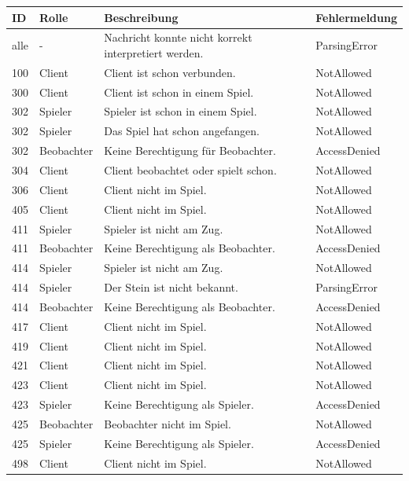 \documentclass[a4paper, 10pt]{article}
\begin{document}
\begin{center}
	\begin{tabular}{| l | l | l | l |}
		\hline
			ID & Rolle & Beschreibung & Fehlermeldung\\
		\hline \hline
			alle & - & Nachricht konnte nicht korrekt interpretiert werden. & ParsingError\\
		\hline
			100 & Client &
			Client ist schon verbunden. & NotAllowed\\
		\hline
			300 & Client &
			Client ist schon in einem Spiel. & NotAllowed\\
		\hline
			302 & Spieler &
			Spieler ist schon in einem Spiel. & NotAllowed\\
		\hline
			302 & Spieler & Das Spiel hat schon angefangen. & NotAllowed\\
		\hline
			302 & Beobachter &
			Keine Berechtigung für Beobachter. & AccessDenied\\
		\hline
			304 & Client &
			Client beobachtet oder spielt schon. & NotAllowed\\
		\hline
			306 & Client &
			Client nicht im Spiel. & NotAllowed\\
		\hline
			405 & Client &
			Client nicht im Spiel. & NotAllowed\\
		\hline
			411 & Spieler & Spieler ist nicht am Zug. & NotAllowed\\
		\hline
			411 & Beobachter & Keine Berechtigung als Beobachter. & AccessDenied\\
		\hline
			414 & Spieler & Spieler ist nicht am Zug. & NotAllowed\\
		\hline
			414 & Spieler & Der Stein ist nicht bekannt. & ParsingError\\
		\hline
			414 & Beobachter & Keine Berechtigung als Beobachter. & AccessDenied\\
		\hline
			417 & Client & Client nicht im Spiel. & NotAllowed\\
		\hline
			419 & Client & Client nicht im Spiel. & NotAllowed\\
		\hline
			421 & Client & Client nicht im Spiel. & NotAllowed\\
		\hline
			423 & Client & Client nicht im Spiel. & NotAllowed\\
		\hline
			423 & Spieler & Keine Berechtigung als Spieler. & AccessDenied\\
		\hline
			425 & Beobachter & Beobachter nicht im Spiel. & NotAllowed\\
		\hline
			425 & Spieler & Keine Berechtigung als Spieler. & AccessDenied\\
		\hline
			498 & Client & Client nicht im Spiel. & NotAllowed\\
		\hline
	\end{tabular}
\end{center}
\end{document}

